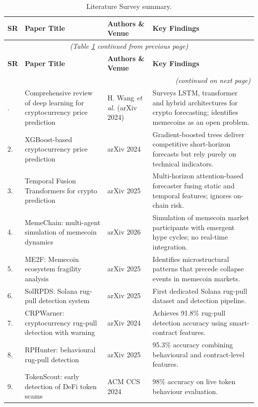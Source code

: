 \documentclass[12pt,a4paper,oneside,openany]{book}
\begin{document}
\begin{small}
\begin{longtable}{@{}p{0.8cm}p{3.8cm}p{3.4cm}p{5.6cm}@{}}
\caption{Literature Survey summary.}\label{tab:lit}\\
\toprule
\textbf{SR} & \textbf{Paper Title} & \textbf{Authors \& Venue} & \textbf{Key Findings} \\
\midrule
\endfirsthead
\multicolumn{4}{c}{\textit{(Table \ref{tab:lit} continued from previous page)}}\\
\toprule
\textbf{SR} & \textbf{Paper Title} & \textbf{Authors \& Venue} & \textbf{Key Findings} \\
\midrule
\endhead
\midrule
\multicolumn{4}{r}{\textit{(continued on next page)}}\\
\endfoot
\bottomrule
\endlastfoot
1. & Comprehensive review of deep learning for cryptocurrency price prediction & H. Wang \textit{et al.} (arXiv 2024)~\cite{ref7} & Surveys LSTM, transformer and hybrid architectures for crypto forecasting; identifies memecoins as an open problem. \\
2. & XGBoost-based cryptocurrency price prediction & arXiv 2024~\cite{ref4} & Gradient-boosted trees deliver competitive short-horizon forecasts but rely purely on technical indicators. \\
3. & Temporal Fusion Transformers for crypto prediction & arXiv 2025~\cite{ref21} & Multi-horizon attention-based forecaster fusing static and temporal features; ignores on-chain risk. \\
4. & MemeChain: multi-agent simulation of memecoin dynamics & arXiv 2026~\cite{ref1} & Simulation of memecoin market participants with emergent hype cycles; no real-time integration. \\
5. & ME2F: Memecoin ecosystem fragility analysis & arXiv 2025~\cite{ref2} & Identifies microstructural patterns that precede collapse events in memecoin markets. \\
6. & SolRPDS: Solana rug-pull detection system & arXiv 2025~\cite{ref3} & First dedicated Solana rug-pull dataset and detection pipeline. \\
7. & CRPWarner: cryptocurrency rug-pull detection with warning & arXiv 2024~\cite{ref5} & Achieves 91.8\% rug-pull detection accuracy using smart-contract features. \\
8. & RPHunter: behavioural rug-pull detection & arXiv 2025~\cite{ref12} & 95.3\% accuracy combining behavioural and contract-level features. \\
9. & TokenScout: early detection of DeFi token scams & ACM CCS 2024~\cite{ref13} & 98\% accuracy on live token behaviour evaluation. \\

\end{longtable}
\end{small}
\end{document}
